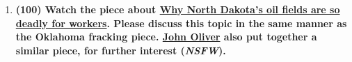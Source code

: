 \documentclass[11pt,a4paper]{article}
\begin{document}
\begin{enumerate}[leftmargin=*,topsep=0pt,font=\bfseries]
        \newpage
    \item\textbf{(100) Watch the piece about \href{http://www.pbs.org/newshour/bb/north-dakotas-oil-fields-deadly-workers/}{Why North Dakota’s oil fields are so deadly for workers}. Please discuss this topic in the same manner as the Oklahoma fracking piece. \href{https://youtu.be/jYusNNldesc}{John Oliver} also put together a similar piece, for further interest (\textit{NSFW}).}
        \vspace{\baselineskip}


































\end{enumerate}

\newpage 


\setlength{\bibhang}{0pt}

\end{document}
